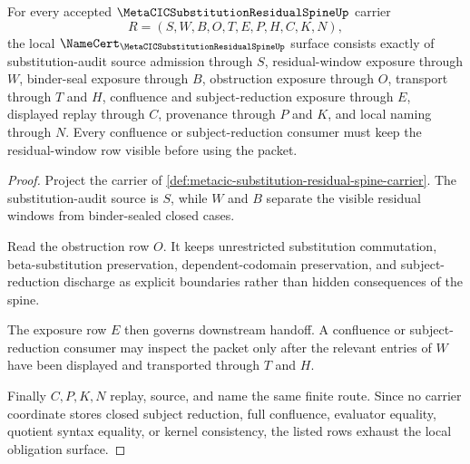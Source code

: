 \begin{theorem}
\label{thm:metacic-substitution-residual-spine-obligations}
For every accepted $\MetaCICSubstitutionResidualSpineUp$ carrier
$$
R=(S,W,B,O,T,E,P,H,C,K,N),
$$
the local $\NameCert_{\MetaCICSubstitutionResidualSpineUp}$ surface consists exactly of substitution-audit source admission through $S$, residual-window exposure through $W$, binder-seal exposure through $B$, obstruction exposure through $O$, transport through $T$ and $H$, confluence and subject-reduction exposure through $E$, displayed replay through $C$, provenance through $P$ and $K$, and local naming through $N$. Every confluence or subject-reduction consumer must keep the residual-window row visible before using the packet.
\end{theorem}
\begin{proof}
Project the carrier of \autoref{def:metacic-substitution-residual-spine-carrier}. The substitution-audit source is $S$, while $W$ and $B$ separate the visible residual windows from binder-sealed closed cases.

Read the obstruction row $O$. It keeps unrestricted substitution commutation, beta-substitution preservation, dependent-codomain preservation, and subject-reduction discharge as explicit boundaries rather than hidden consequences of the spine.

The exposure row $E$ then governs downstream handoff. A confluence or subject-reduction consumer may inspect the packet only after the relevant entries of $W$ have been displayed and transported through $T$ and $H$.

Finally $C,P,K,N$ replay, source, and name the same finite route. Since no carrier coordinate stores closed subject reduction, full confluence, evaluator equality, quotient syntax equality, or kernel consistency, the listed rows exhaust the local obligation surface.
\end{proof}

